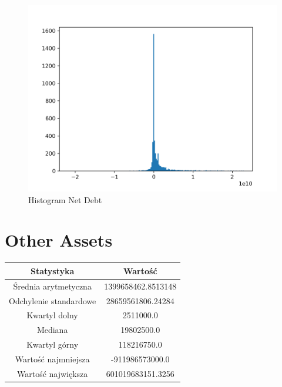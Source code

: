 \documentclass{article}
\begin{document}
\begin{figure}[h!]
    \includegraphics[width=\linewidth]{variables/Net Debt.png}
    \caption{Histogram Net Debt }
\end{figure}\section{ Other Assets }

\begin{center}
    \begin{tabular}{|c | c|} 
    \hline
    Statystyka & Wartość \\
    \hline\hline
    Średnia arytmetyczna & 1399658462.8513148 \\ 
    \hline
    Odchylenie standardowe & 28659561806.24284 \\
    \hline
    Kwartyl dolny & 2511000.0 \\
    \hline
    Mediana & 19802500.0 \\
    \hline
    Kwartyl górny & 118216750.0 \\
    \hline
    Wartość najmniejsza & -911986573000.0 \\
    \hline
    Wartość największa & 601019683151.3256 \\
    \hline
   \end{tabular}
\end{center}
\end{document}

